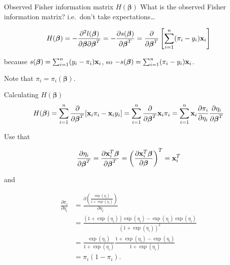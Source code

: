 \documentclass[
  ignorenonframetext,
]{beamer}
\begin{document}
\begin{frame}
\begin{block}{Observed Fisher information matrix
\(H(\boldsymbol{\beta})\)}
\protect\hypertarget{observed-fisher-information-matrix-hboldsymbolbeta}{}
What is the observed Fisher information matrix? i.e.~don't take
expectations\ldots{}

\[H(\boldsymbol{\beta}) = -\frac{\partial^2l(\boldsymbol{\beta})}{\partial\boldsymbol{\beta}\partial\boldsymbol{\beta}^T} = -\frac{\partial s(\boldsymbol{\beta})}{\partial\boldsymbol{\beta}^T} = \frac{\partial}{\partial\boldsymbol{\beta}^T}\left[\sum_{i=1}^n (\pi_i-y_i){\bf x}_i \right] \]

because \(s(\boldsymbol{\beta}) = \sum_{i=1}^n (y_i-\pi_i){\bf x}_i\),
so \(-s(\boldsymbol{\beta}) = \sum_{i=1}^n (\pi_i-y_i){\bf x}_i\).

Note that \(\pi_i = \pi_i(\boldsymbol{\beta})\).
\end{block}
\end{frame}

\begin{frame}
\begin{block}{Calculating \(H(\boldsymbol{\beta})\)}
\protect\hypertarget{calculating-hboldsymbolbeta}{}
\[H(\boldsymbol{\beta}) = \sum_{i=1}^n \frac{\partial}{\partial\boldsymbol{\beta}^T}[{\bf x}_i\pi_i-{\bf x}_iy_i] = \sum_{i=1}^n \frac{\partial}{\partial\boldsymbol{\beta}^T}{\bf x}_i\pi_i = \sum_{i=1}^n {\bf x}_i \frac{\partial \pi_i}{\partial \eta_i} \frac{\partial \eta_i}{\partial \boldsymbol{\beta}^T} \]
\end{block}
\end{frame}

\begin{frame}
Use that

\[ \frac{\partial \eta_i}{\partial \boldsymbol{\beta}^T}=\frac{\partial {\bf x}_i^T\boldsymbol{\beta}}{\partial \boldsymbol{\beta}^T} = \left(\frac{\partial {\bf x}_i^T\boldsymbol{\beta}}{\partial \boldsymbol{\beta}}\right)^T = {\bf x}_i^T \]

and

\[
\begin{aligned}
\frac{\partial \pi_i}{\partial \eta_i} &=  \frac{\partial\left(\frac{\exp(\eta_i)}{1+\exp(\eta_i)}\right)}{\partial \eta_i}\\ &= \frac{(1+\exp(\eta_i))\exp(\eta_i) - \exp(\eta_i)\exp(\eta_i)}{(1+\exp(\eta_i))^2} \\
&= \frac{\exp(\eta_i)}{1+\exp(\eta_i)} \frac{1+\exp(\eta_i)-\exp(\eta_i)}{1+\exp(\eta_i)} \\
&=\pi_i (1-\pi_i).
\end{aligned}
\]
\end{frame}
\end{document}
